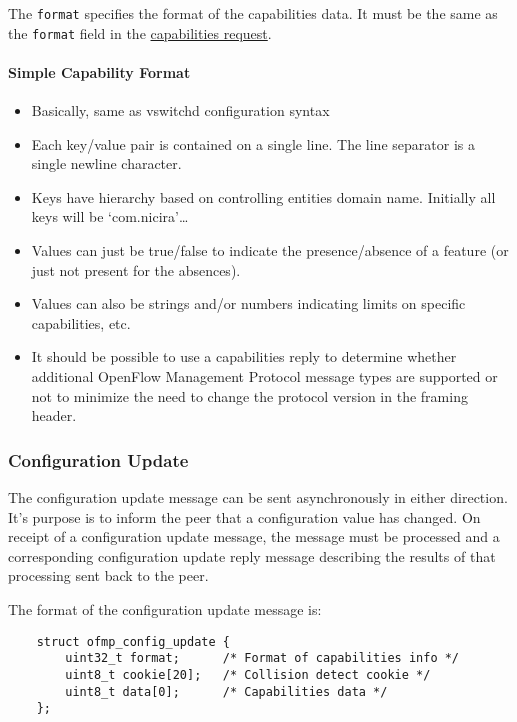 \documentclass[11pt,a4paper]{article}
\begin{document}
     The \verb|format| specifies the format of the capabilities data.  It
     must be the same as the \verb|format| field in the
     \hyperref[sec-2.8.2]{capabilities request}.

\paragraph{Simple Capability Format}
\label{sec-2.8.3.1}

\begin{itemize}
\item Basically, same as vswitchd configuration syntax
\item Each key/value pair is contained on a single line.  The line
       separator is a single newline character.
\item Keys have hierarchy based on controlling entities domain
       name.  Initially all keys will be `com.nicira'\ldots{}
\item Values can just be true/false to indicate the presence/absence
       of a feature (or just not present for the absences).
\item Values can also be strings and/or numbers indicating limits on
       specific capabilities, etc.
\item It should be possible to use a capabilities reply to determine
       whether additional OpenFlow Management Protocol message
       types are supported or not to minimize the need to change the
       protocol version in the framing header.
\end{itemize}
\subsubsection{Configuration Update}
\label{sec-2.8.4}


    The configuration update message can be sent asynchronously in
    either direction.  It's purpose is to inform the peer that a
    configuration value has changed.  On receipt of a configuration
    update message, the message must be processed and a corresponding
    configuration update reply message describing the results of that
    processing sent back to the peer.

    The format of the configuration update message is:

{ \footnotesize

\begin{verbatim}
    struct ofmp_config_update {
        uint32_t format;      /* Format of capabilities info */
        uint8_t cookie[20];   /* Collision detect cookie */
        uint8_t data[0];      /* Capabilities data */
    };

\end{verbatim}


}
\end{document}

